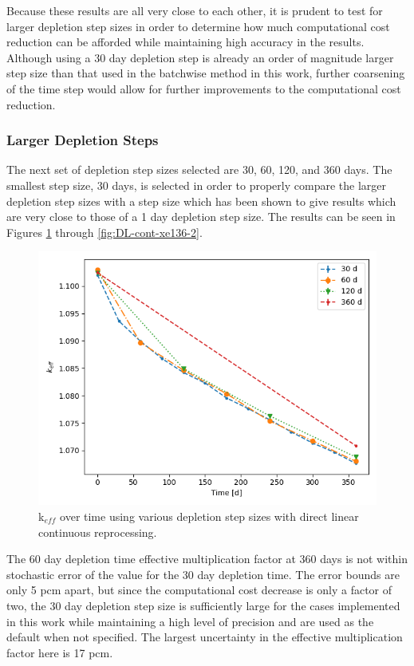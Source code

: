 Because these results are all very close to each other, it is prudent to test for larger depletion step sizes in order to determine how much computational cost reduction can be afforded while maintaining high accuracy in the results. Although using a 30 day depletion step is already an order of magnitude larger step size than that used in the batchwise method in this work, further coarsening of the time step would allow for further improvements to the computational cost reduction.

\subsubsection{Larger Depletion Steps}

The next set of depletion step sizes selected are 30, 60, 120, and 360 days. The smallest step size, 30 days, is selected in order to properly compare the larger depletion step sizes with a step size which has been shown to give results which are very close to those of a 1 day depletion step size. The results can be seen in Figures \ref{fig:DL-cont-k-2} through \ref{fig:DL-cont-xe136-2}. 

\begin{figure}[H]
  \centering
  \includegraphics[scale=0.7]{images/DL_NSTEP_keff-large.png}
  \caption{k$_{eff}$ over time using various depletion step sizes with direct linear continuous reprocessing.}
   \label{fig:DL-cont-k-2}
\end{figure}

The 60 day depletion time effective multiplication factor at 360 days is not within stochastic error of the value for the 30 day depletion time. The error bounds are only 5 pcm apart, but since the computational cost decrease is only a factor of two, the 30 day depletion step size is sufficiently large for the cases implemented in this work while maintaining a high level of precision and are used as the default when not specified.
The largest uncertainty in the effective multiplication factor here is 17 pcm.

